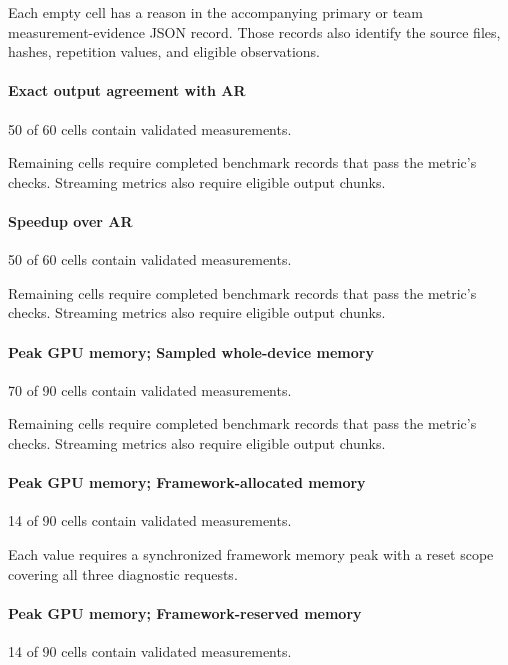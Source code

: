 Each empty cell has a reason in the accompanying primary or team measurement-evidence JSON record. Those records also identify the source files, hashes, repetition values, and eligible observations.

\paragraph*{Exact output agreement with AR}

50 of 60 cells contain validated measurements.

Remaining cells require completed benchmark records that pass the metric's checks. Streaming metrics also require eligible output chunks.

\paragraph*{Speedup over AR}

50 of 60 cells contain validated measurements.

Remaining cells require completed benchmark records that pass the metric's checks. Streaming metrics also require eligible output chunks.

\paragraph*{Peak GPU memory; Sampled whole-device memory}

70 of 90 cells contain validated measurements.

Remaining cells require completed benchmark records that pass the metric's checks. Streaming metrics also require eligible output chunks.

\paragraph*{Peak GPU memory; Framework-allocated memory}

14 of 90 cells contain validated measurements.

Each value requires a synchronized framework memory peak with a reset scope covering all three diagnostic requests.

\paragraph*{Peak GPU memory; Framework-reserved memory}

14 of 90 cells contain validated measurements.

